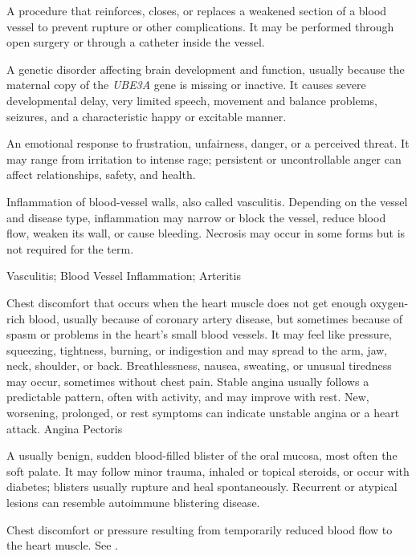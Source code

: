  A procedure that reinforces, closes, or replaces a weakened section of a blood vessel to prevent rupture or other complications. It may be performed through open surgery or through a catheter inside the vessel.

 A genetic disorder affecting brain development and function, usually because the maternal copy of the \textit{UBE3A} gene is missing or inactive. It causes severe developmental delay, very limited speech, movement and balance problems, seizures, and a characteristic happy or excitable manner.

 An emotional response to frustration, unfairness, danger, or a perceived threat. It may range from irritation to intense rage; persistent or uncontrollable anger can affect relationships, safety, and health.

 Inflammation of blood-vessel walls, also called vasculitis. Depending on the vessel and disease type,
inflammation may narrow or block the vessel, reduce blood flow, weaken its wall, or cause bleeding.
Necrosis may occur in some forms but is not required for the term.

\synonyms
Vasculitis; Blood Vessel Inflammation; Arteritis

 Chest discomfort that occurs when the heart muscle does not get enough oxygen-rich blood, usually because of coronary artery disease, but sometimes because of spasm or problems in the heart's small blood vessels. It may feel like pressure, squeezing, tightness, burning, or indigestion and may spread to the arm, jaw, neck, shoulder, or back. Breathlessness, nausea, sweating, or unusual tiredness may occur, sometimes without chest pain. Stable angina usually follows a predictable pattern, often with activity, and may improve with rest. New, worsening, prolonged, or rest symptoms can indicate unstable angina or a heart attack.
\synonyms
Angina Pectoris

 A usually benign, sudden blood-filled blister of the oral mucosa, most often the soft palate. It may follow minor trauma, inhaled or topical steroids, or occur with diabetes; blisters usually rupture and heal spontaneously. Recurrent or atypical lesions can resemble autoimmune blistering disease.

 Chest discomfort or pressure resulting from temporarily reduced blood flow to the heart muscle. See .

